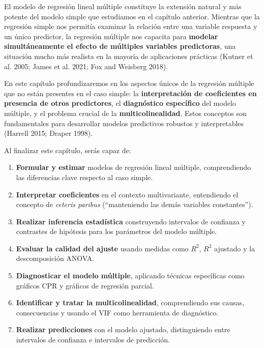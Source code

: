 \documentclass[
  letterpaper,
  DIV=11,
  numbers=noendperiod]{scrreprt}
\providecommand{\tightlist}{%
  \setlength{\itemsep}{0pt}\setlength{\parskip}{0pt}}
\begin{document}
El modelo de regresión lineal múltiple constituye la extensión natural y
más potente del modelo simple que estudiamos en el capítulo anterior.
Mientras que la regresión simple nos permitía examinar la relación entre
una variable respuesta y un único predictor, la regresión múltiple nos
capacita para \textbf{modelar simultáneamente el efecto de múltiples
variables predictoras}, una situación mucho más realista en la mayoría
de aplicaciones prácticas (Kutner et al. 2005; James et al. 2021; Fox
and Weisberg 2018).

En este capítulo profundizaremos en los aspectos únicos de la regresión
múltiple que no están presentes en el caso simple: la
\textbf{interpretación de coeficientes en presencia de otros
predictores}, el \textbf{diagnóstico específico} del modelo múltiple, y
el problema crucial de la \textbf{multicolinealidad}. Estos conceptos
son fundamentales para desarrollar modelos predictivos robustos y
interpretables (Harrell 2015; Draper 1998).

\begin{tcolorbox}[enhanced jigsaw, breakable, toprule=.15mm, bottomtitle=1mm, coltitle=black, colbacktitle=quarto-callout-important-color!10!white, titlerule=0mm, opacitybacktitle=0.6, bottomrule=.15mm, toptitle=1mm, title=\textcolor{quarto-callout-important-color}{\faExclamation}\hspace{0.5em}{Objetivos de aprendizaje}, arc=.35mm, rightrule=.15mm, opacityback=0, colframe=quarto-callout-important-color-frame, leftrule=.75mm, left=2mm, colback=white]

Al finalizar este capítulo, serás capaz de:

\begin{enumerate}
\def\labelenumi{\arabic{enumi}.}
\tightlist
\item
  \textbf{Formular y estimar} modelos de regresión lineal múltiple,
  comprendiendo las diferencias clave respecto al caso simple.
\item
  \textbf{Interpretar coeficientes} en el contexto multivariante,
  entendiendo el concepto de \emph{ceteris paribus} (``manteniendo las
  demás variables constantes'').
\item
  \textbf{Realizar inferencia estadística} construyendo intervalos de
  confianza y contrastes de hipótesis para los parámetros del modelo
  múltiple.
\item
  \textbf{Evaluar la calidad del ajuste} usando medidas como \(R^2\),
  \(R^2\) ajustado y la descomposición ANOVA.
\item
  \textbf{Diagnosticar el modelo múltiple}, aplicando técnicas
  específicas como gráficos CPR y gráficos de regresión parcial.
\item
  \textbf{Identificar y tratar la multicolinealidad}, comprendiendo sus
  causas, consecuencias y usando el VIF como herramienta de diagnóstico.
\item
  \textbf{Realizar predicciones} con el modelo ajustado, distinguiendo
  entre intervalos de confianza e intervalos de predicción.
\end{enumerate}

\end{tcolorbox}
\end{document}
